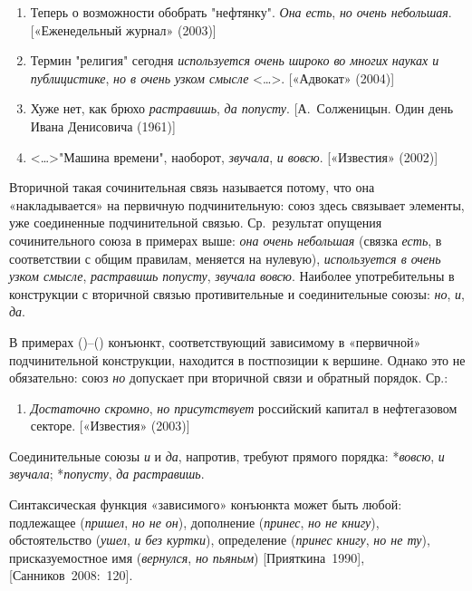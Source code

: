 \begin{enumerate}
  \def\labelenumi{(\arabic{enumi})}
  \setcounter{enumi}{43}
  \item
        Теперь о возможности обобрать "нефтянку". \textit{Она есть}, \textit{но
          очень небольшая}. {[}«Еженедельный журнал» (2003){]}
  \item
        Термин "религия" сегодня \textit{используется очень широко во многих
          науках и публицистике}, \textit{но в очень узком смысле}
        \textless\ldots\textgreater. {[}«Адвокат» (2004){]}
  \item
        Хуже нет, как брюхо \textit{растравишь}, \textit{да попусту}.
        {[}А.~Солженицын. Один день Ивана Денисовича (1961){]}
  \item
        \textless\ldots\textgreater"Машина времени", наоборот, \textit{звучала},
        \textit{и вовсю}. {[}«Известия» (2002){]}
\end{enumerate}

Вторичной такая сочинительная связь называется потому, что она
«накладывается» на первичную подчинительную: союз здесь связывает
элементы, уже соединенные подчинительной связью. Ср.~результат опущения
сочинительного союза в примерах выше: \textit{она очень небольшая} (связка
\textit{есть}, в соответствии с общим правилам, меняется на нулевую),
\textit{используется в очень узком смысле}, \textit{растравишь попусту},
\textit{звучала вовсю}. Наиболее употребительны в конструкции с вторичной
связью противительные и соединительные союзы: \textit{но}, \textit{и},
\textit{да}.

В примерах ()--() конъюнкт, соответствующий зависимому в «первичной»
подчинительной конструкции, находится в постпозиции к вершине. Однако
это не обязательно: союз \textit{но} допускает при вторичной связи и
обратный порядок. Ср.:

\begin{enumerate}
  \def\labelenumi{(\arabic{enumi})}
  \setcounter{enumi}{47}
  \item
        \textit{Достаточно скромно}, \textit{но присутствует} российский капитал в
        нефтегазовом секторе. {[}«Известия» (2003){]}
\end{enumerate}

Соединительные союзы \textit{и} и \textit{да}, напротив, требуют прямого
порядка: *\textit{вовсю}, \textit{и звучала}; *\textit{попусту}, \textit{да
  растравишь}.

Синтаксическая функция «зависимого» конъюнкта может быть любой:
подлежащее (\textit{пришел}, \textit{но не он}), дополнение (\textit{принес},
\textit{но не книгу}), обстоятельство (\textit{ушел}, \textit{и без куртки}),
определение (\textit{принес книгу}, \textit{но не ту}), присказуемостное имя
(\textit{вернулся}, \textit{но пьяным}) {[}Прияткина~1990{]},
{[}Санников~2008:~120{]}.

